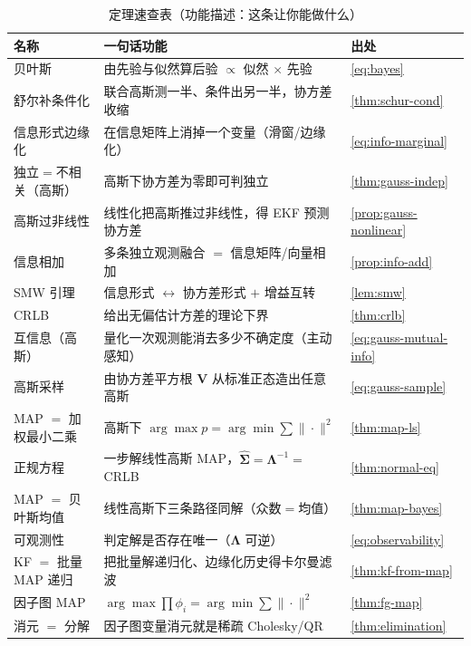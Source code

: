 \begin{table}[ht]\centering\small
\caption{定理速查表（功能描述：这条让你能做什么）}
\begin{tabular}{lll}
\toprule
名称 & 一句话功能 & 出处 \\
\midrule
贝叶斯 & 由先验与似然算后验 $\propto$ 似然 $\times$ 先验 & \cref{eq:bayes} \\
舒尔补条件化 & 联合高斯测一半、条件出另一半，协方差收缩 & \cref{thm:schur-cond} \\
信息形式边缘化 & 在信息矩阵上消掉一个变量（滑窗/边缘化） & \cref{eq:info-marginal} \\
独立$=$不相关（高斯） & 高斯下协方差为零即可判独立 & \cref{thm:gauss-indep} \\
高斯过非线性 & 线性化把高斯推过非线性，得 EKF 预测协方差 & \cref{prop:gauss-nonlinear} \\
信息相加 & 多条独立观测融合 $=$ 信息矩阵/向量相加 & \cref{prop:info-add} \\
SMW 引理 & 信息形式 $\leftrightarrow$ 协方差形式 $+$ 增益互转 & \cref{lem:smw} \\
CRLB & 给出无偏估计方差的理论下界 & \cref{thm:crlb} \\
互信息（高斯） & 量化一次观测能消去多少不确定度（主动感知） & \cref{eq:gauss-mutual-info} \\
高斯采样 & 由协方差平方根 $\mathbf{V}$ 从标准正态造出任意高斯 & \cref{eq:gauss-sample} \\
MAP $=$ 加权最小二乘 & 高斯下 $\arg\max p=\arg\min\sum\|\cdot\|^2$ & \cref{thm:map-ls} \\
正规方程 & 一步解线性高斯 MAP，$\hat{\boldsymbol{\Sigma}}=\boldsymbol{\Lambda}^{-1}=$ CRLB & \cref{thm:normal-eq} \\
MAP $=$ 贝叶斯均值 & 线性高斯下三条路径同解（众数$=$均值） & \cref{thm:map-bayes} \\
可观测性 & 判定解是否存在唯一（$\boldsymbol{\Lambda}$ 可逆） & \cref{eq:observability} \\
KF $=$ 批量 MAP 递归 & 把批量解递归化、边缘化历史得卡尔曼滤波 & \cref{thm:kf-from-map} \\
因子图 MAP & $\arg\max\prod\phi_i=\arg\min\sum\|\cdot\|^2$ & \cref{thm:fg-map} \\
消元 $=$ 分解 & 因子图变量消元就是稀疏 Cholesky/QR & \cref{thm:elimination} \\
\bottomrule
\end{tabular}
\end{table}

